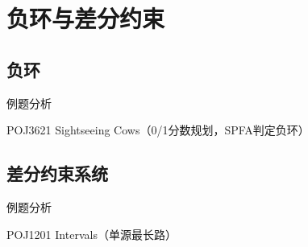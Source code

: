 \section{负环与差分约束}
\subsection{负环}
例题分析

POJ3621 Sightseeing Cows（0/1分数规划，SPFA判定负环）

\subsection{差分约束系统}
例题分析

POJ1201 Intervals（单源最长路）